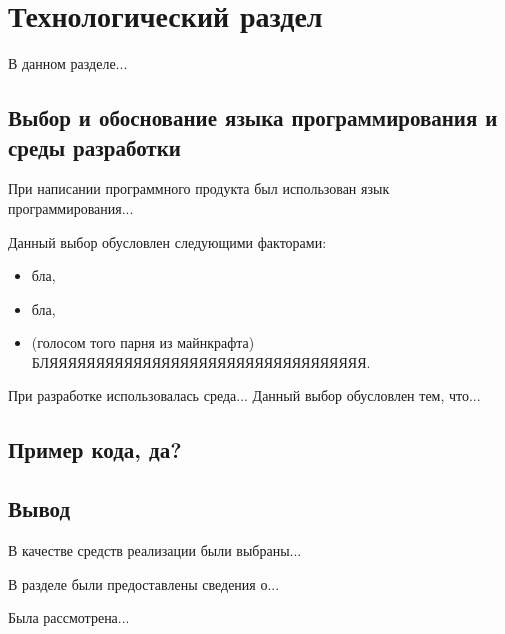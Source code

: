 \section{Технологический раздел}
В данном разделе...

\subsection{Выбор и обоснование языка программирования и среды разработки}
При написании программного продукта был использован язык программирования... 

Данный выбор обусловлен следующими факторами:
\begin{itemize}
\item бла,
\item бла,
\item (голосом того парня из майнкрафта) БЛЯЯЯЯЯЯЯЯЯЯЯЯЯЯЯЯЯЯЯЯЯЯЯЯЯЯЯЯЯЯЯЯЯЯ.
\end{itemize}

При разработке использовалась среда... Данный выбор обусловлен тем, что...

\subsection{Пример кода, да?}


\subsection*{Вывод}
В качестве средств реализации были выбраны...

В разделе были предоставлены сведения о...

Была рассмотрена...